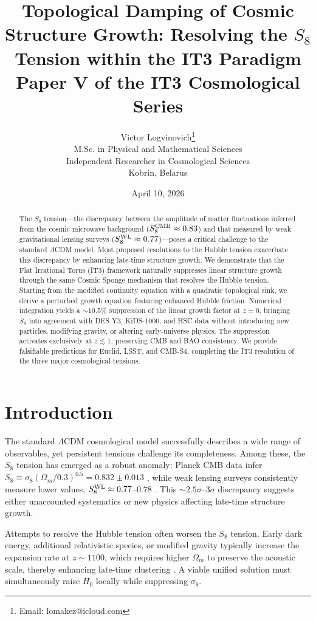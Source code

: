 \documentclass[12pt,a4paper]{article}
\title{\textbf{Topological Damping of Cosmic Structure Growth: Resolving the $S_8$ Tension within the IT3 Paradigm}\\[0.5cm]
\large Paper V of the IT3 Cosmological Series}
\author{Victor Logvinovich\thanks{Email: lomakez@icloud.com}\\
M.Sc. in Physical and Mathematical Sciences\\
Independent Researcher in Cosmological Sciences\\
Kobrin, Belarus}
\date{April 10, 2026}
\begin{document}
\maketitle

\begin{abstract}
The $S_8$ tension—the discrepancy between the amplitude of matter fluctuations inferred from the cosmic microwave background ($S_8^{\rm CMB} \approx 0.83$) and that measured by weak gravitational lensing surveys ($S_8^{\rm WL} \approx 0.77$)—poses a critical challenge to the standard $\Lambda$CDM model. Most proposed resolutions to the Hubble tension exacerbate this discrepancy by enhancing late-time structure growth. We demonstrate that the Flat Irrational Torus (IT3) framework naturally suppresses linear structure growth through the same Cosmic Sponge mechanism that resolves the Hubble tension. Starting from the modified continuity equation with a quadratic topological sink, we derive a perturbed growth equation featuring enhanced Hubble friction. Numerical integration yields a $\sim 10.5\%$ suppression of the linear growth factor at $z=0$, bringing $S_8$ into agreement with DES Y3, KiDS-1000, and HSC data without introducing new particles, modifying gravity, or altering early-universe physics. The suppression activates exclusively at $z \lesssim 1$, preserving CMB and BAO consistency. We provide falsifiable predictions for Euclid, LSST, and CMB-S4, completing the IT3 resolution of the three major cosmological tensions.
\end{abstract}

\section{Introduction}

The standard $\Lambda$CDM cosmological model successfully describes a wide range of observables, yet persistent tensions challenge its completeness. Among these, the $S_8$ tension has emerged as a robust anomaly: Planck CMB data infer $S_8 \equiv \sigma_8(\Omega_m/0.3)^{0.5} = 0.832 \pm 0.013$ \citep{Planck2020}, while weak lensing surveys consistently measure lower values, $S_8^{\rm WL} \approx 0.77$--$0.78$ \citep{Heymans2021, DES2021, KiDS2021}. This $\sim 2.5\sigma$–$3\sigma$ discrepancy suggests either unaccounted systematics or new physics affecting late-time structure growth.

Attempts to resolve the Hubble tension often worsen the $S_8$ tension. Early dark energy, additional relativistic species, or modified gravity typically increase the expansion rate at $z \sim 1100$, which requires higher $\Omega_m$ to preserve the acoustic scale, thereby enhancing late-time clustering \citep{Poulin2019, Knox2019}. A viable unified solution must simultaneously raise $H_0$ locally while suppressing $\sigma_8$.
\end{document}
